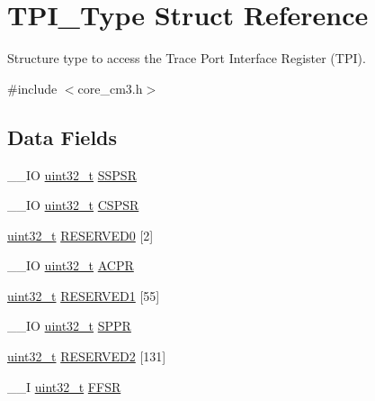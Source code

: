 \hypertarget{struct_t_p_i___type}{\section{T\-P\-I\-\_\-\-Type Struct Reference}
\label{struct_t_p_i___type}
}


Structure type to access the Trace Port Interface Register (T\-P\-I).  




{\ttfamily \#include $<$core\-\_\-cm3.\-h$>$}

\subsection*{Data Fields}
\begin{DoxyCompactItemize}
\item 
\-\_\-\-\_\-\-I\-O \hyperlink{stdint_8h_a435d1572bf3f880d55459d9805097f62}{uint32\-\_\-t} \hyperlink{struct_t_p_i___type_a158e9d784f6ee6398f4bdcb2e4ca0912}{S\-S\-P\-S\-R}
\item 
\-\_\-\-\_\-\-I\-O \hyperlink{stdint_8h_a435d1572bf3f880d55459d9805097f62}{uint32\-\_\-t} \hyperlink{struct_t_p_i___type_aa723ef3d38237aa2465779b3cc73a94a}{C\-S\-P\-S\-R}
\item 
\hyperlink{stdint_8h_a435d1572bf3f880d55459d9805097f62}{uint32\-\_\-t} \hyperlink{struct_t_p_i___type_ad331234edd4a834f478e67bd979dc909}{R\-E\-S\-E\-R\-V\-E\-D0} \mbox{[}2\mbox{]}
\item 
\-\_\-\-\_\-\-I\-O \hyperlink{stdint_8h_a435d1572bf3f880d55459d9805097f62}{uint32\-\_\-t} \hyperlink{struct_t_p_i___type_ad75832a669eb121f6fce3c28d36b7fab}{A\-C\-P\-R}
\item 
\hyperlink{stdint_8h_a435d1572bf3f880d55459d9805097f62}{uint32\-\_\-t} \hyperlink{struct_t_p_i___type_a1626c5caf1c386f81ca01eb0daea2e51}{R\-E\-S\-E\-R\-V\-E\-D1} \mbox{[}55\mbox{]}
\item 
\-\_\-\-\_\-\-I\-O \hyperlink{stdint_8h_a435d1572bf3f880d55459d9805097f62}{uint32\-\_\-t} \hyperlink{struct_t_p_i___type_a3eb655f2e45d7af358775025c1a50c8e}{S\-P\-P\-R}
\item 
\hyperlink{stdint_8h_a435d1572bf3f880d55459d9805097f62}{uint32\-\_\-t} \hyperlink{struct_t_p_i___type_acc0bbc252ec6ffa1db1a40cd8dd41b95}{R\-E\-S\-E\-R\-V\-E\-D2} \mbox{[}131\mbox{]}
\item 
\-\_\-\-\_\-\-I \hyperlink{stdint_8h_a435d1572bf3f880d55459d9805097f62}{uint32\-\_\-t} \hyperlink{struct_t_p_i___type_ae67849b2c1016fe6ef9095827d16cddd}{F\-F\-S\-R}

\end{DoxyCompactItemize}
